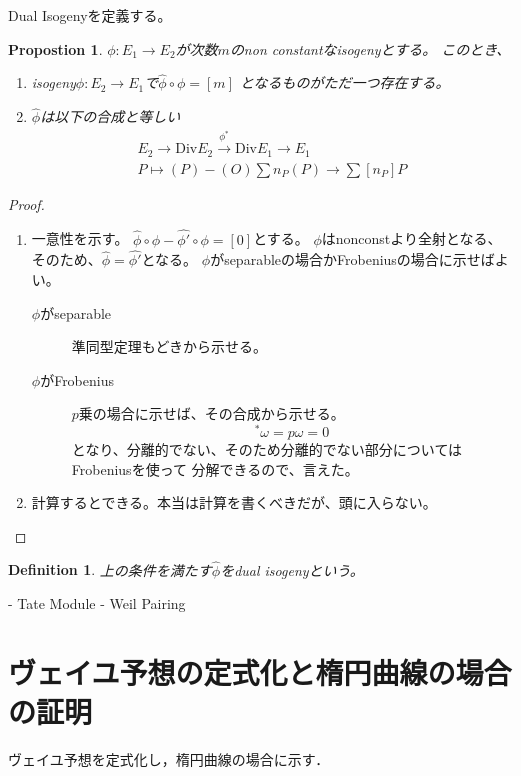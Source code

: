 \documentclass{ujarticle}
\newtheorem{dfn}[thm]{Definition}
\newtheorem{prop}[thm]{Propostion}
\begin{document}
Dual Isogenyを定義する。
\begin{prop}
 $\phi:E_1 \to E_2$が次数$m$のnon constantなisogenyとする。
 このとき、
 \begin{enumerate}
   \item isogeny$\hat{\phi}:E_2 \to E_1$で$\hat{\phi} \circ \phi= [m]$
   となるものがただ一つ存在する。
   \item $\hat{\phi}$は以下の合成と等しい
   \begin{eqnarray*}
    E_2 \to \mathrm{Div}E_2 \xrightarrow{\phi^*} \mathrm{Div}E_1 \to E_1 \\
    P \mapsto (P) - (O)                         \sum n_P(P) \to \sum[n_P]P
   \end{eqnarray*}
 \end{enumerate}
\end{prop}
\begin{proof}
\begin{enumerate}
  \item 一意性を示す。
  $\hat{\phi}\circ \phi - \hat{\phi'} \circ \phi = [0]$とする。
  $\phi$はnonconstより全射となる、そのため、$\hat{\phi} = \hat{\phi'}$となる。
  $\phi$がseparableの場合かFrobeniusの場合に示せばよい。
  \begin{description}
    \item[$\phi$がseparable] 準同型定理もどきから示せる。
    \item[$\phi$がFrobenius] $p$乗の場合に示せば、その合成から示せる。
    \begin{equation*}
      [p]^{*} \omega = p \omega = 0
    \end{equation*}
    となり、分離的でない、そのため分離的でない部分についてはFrobeniusを使って
    分解できるので、言えた。
  \end{description}
  \item 計算するとできる。本当は計算を書くべきだが、頭に入らない。
\end{enumerate}
\end{proof}
\begin{dfn}
 上の条件を満たす$\hat{\phi}$をdual isogenyという。
\end{dfn}

- Tate Module
- Weil Pairing


\section{ヴェイユ予想の定式化と楕円曲線の場合の証明}
\label{sec:ヴェイユ予想の定式化と楕円曲線の場合の証明}
ヴェイユ予想を定式化し，楕円曲線の場合に示す．
\end{document}
